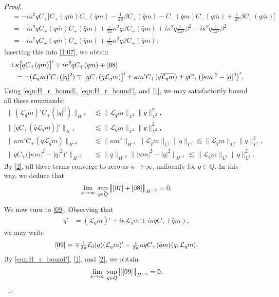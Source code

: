 \documentclass{amsart}
\numberwithin{equation}{section}
\theoremstyle{definition}
\newcommand{\ka}{\kappa}
\newcommand{\E}{\mathcal{E}}
\newcommand{\Lc}{\mathcal{L}}
\begin{document}
\begin{proof}
\begin{align*}
&=-i\ka^2qC_+\bigl[C_+(q\overline{m}) C_+(\bar q m) -\tfrac1{2\pi}\beta C_+(\bar q m) - C_-(\bar q m) C_-(q\overline m)+\tfrac1{2\pi}\beta C_-(q\overline m)\bigr]\\
&= -i\ka^2qC_+(q\overline{m}) C_+(\bar q m) +\tfrac{i}{2\pi}\ka^2q\beta C_+(\bar q m) + i\ka^2q\tfrac1{4\pi^2}\beta^2 - i\ka^2q\tfrac1{4\pi^2}\beta^2\\
&= -i\ka^2qC_+(q\overline{m}) C_+(\bar q m) +\tfrac{i}{2\pi}\ka^2q\beta C_+(\bar q m).
\end{align*}
Inserting this into \eqref{1:07}, we obtain
\begin{align*}
\pm &\ka \bigl[q  C_+(\bar{q}m)\bigr]' \mp i\ka^2 q C_+(\bar{q}m) +\eqref{08}\\
&=\pm (\Lc_qm)'C_+(|q|^2)\mp\bigl[q C_+(\bar q \Lc_qm)\bigr]'\pm \ka m' C_+(q\overline{\Lc_qm})\pm q C_+\bigl(|\ka m|^2-|q|^2\bigr)' .
\end{align*}
Using \eqref{eqn:H_r_bound}, \eqref{eqn:H_r_bound'}, and \eqref{1}, we may satisfactorily bound all these summands:
\begin{align*}
\bigl\| (\Lc_qm)'C_+(|q|^2) \bigr\|_{H^{-3}}&\lesssim \|\Lc_qm\|_{L^2}\|q\|_{L^2}^2,\\
\bigl\| \bigl[q C_+(\bar q \Lc_qm)\bigr]'\bigr\|_{H^{-4}}&\lesssim \|\Lc_qm\|_{L^2}\|q\|_{L^2}^2,\\
\bigl\| \ka m' C_+(q\overline{\Lc_qm})\bigr\|_{H^{-3}}&\lesssim \|\ka m'\|_{H^{-1}} \|\Lc_qm\|_{L^2}\|q\|_{L^2}\lesssim \|\Lc_qm\|_{L^2}\|q\|_{L^2}^2,\\
\bigl\|q C_+\bigl(|\ka m|^2-|q|^2\bigr)' \bigr\|_{H^{-5}}&\lesssim\|q\|_{H^{-2}}\bigl\||\ka m|^2-|q|^2\bigr\|_{H^{-1}}\lesssim  \|\Lc_q m\|_{L^2}\|q\|_{L^2}^2.
\end{align*}
By \eqref{2}, all these terms converge to zero as $\ka \to \infty$, uniformly for $q\in Q$.  In this way, we deduce that
\begin{align*}
\lim_{\ka\to\infty}\,\sup_{q\in Q}\,\bigl\|\eqref{07}+\eqref{08} \bigr\|_{H^{-5}}=0.
\end{align*}

We now turn to \eqref{09}. Observing that 
\begin{align*}
q'&=(\Lc_qm)' +i\ka\Lc_qm \pm i\ka qC_+(\bar{q}m),
\end{align*}
we may write
\begin{align*}
\eqref{09}= \mp\tfrac{1}{2\pi}\E_0(q)(\Lc_qm)'-\tfrac i{2\pi}\ka q C_+(\bar q m)\langle q, \Lc_qm\rangle.
\end{align*}
By \eqref{eqn:H_r_bound'}, \eqref{1}, and \eqref{2}, we obtain
\begin{align*}
\lim_{\ka\to\infty}\,\sup_{q\in Q}\,\bigl\|\eqref{09} \bigr\|_{H^{-3}}=0.
\end{align*}


\end{proof}
\end{document}
